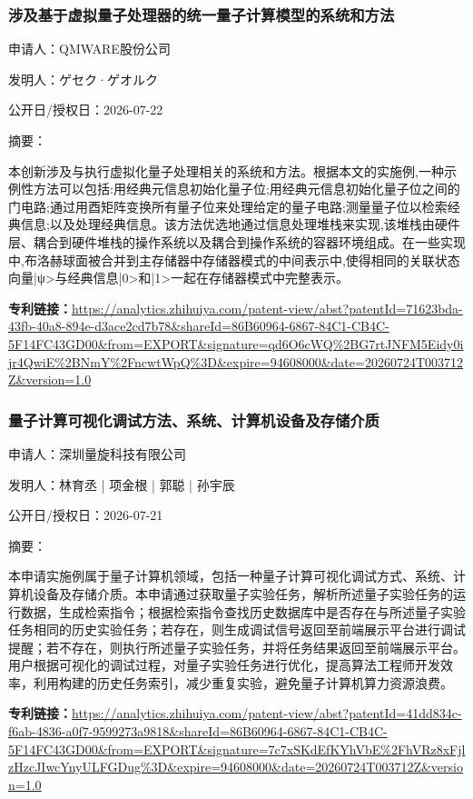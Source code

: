 \documentclass[12pt,a4paper]{ctexart}
\begin{document}
\subsubsection{ 涉及基于虚拟量子处理器的统一量子计算模型的系统和方法 }

申请人：QMWARE股份公司

发明人：ゲセク·ゲオルク

公开日/授权日：2026-07-22

摘要：

本创新涉及与执行虚拟化量子处理相关的系统和方法。根据本文的实施例,一种示例性方法可以包括:用经典元信息初始化量子位;用经典元信息初始化量子位之间的门电路;通过用酉矩阵变换所有量子位来处理给定的量子电路;测量量子位以检索经典信息;以及处理经典信息。该方法优选地通过信息处理堆栈来实现,该堆栈由硬件层、耦合到硬件堆栈的操作系统以及耦合到操作系统的容器环境组成。在一些实现中,布洛赫球面被合并到主存储器中存储器模式的中间表示中,使得相同的关联状态向量|ψ>与经典信息|0>和|1>一起在存储器模式中完整表示。

\noindent\textbf{专利链接：}\url{https://analytics.zhihuiya.com/patent-view/abst?patentId=71623bda-43fb-40a8-894e-d3ace2cd7b78&shareId=86B60964-6867-84C1-CB4C-5F14FC43GD00&from=EXPORT&signature=qd6O6cWQ%2BG7rtJNFM5Eidy0ijr4QwiE%2BNmY%2FncwtWpQ%3D&expire=94608000&date=20260724T003712Z&version=1.0}

\subsubsection{ 量子计算可视化调试方法、系统、计算机设备及存储介质 }

申请人：深圳量旋科技有限公司

发明人：林育丞 | 项金根 | 郭聪 | 孙宇辰

公开日/授权日：2026-07-21

摘要：

本申请实施例属于量子计算机领域，包括一种量子计算可视化调试方式、系统、计算机设备及存储介质。本申请通过获取量子实验任务，解析所述量子实验任务的运行数据，生成检索指令；根据检索指令查找历史数据库中是否存在与所述量子实验任务相同的历史实验任务；若存在，则生成调试信号返回至前端展示平台进行调试提醒；若不存在，则执行所述量子实验任务，并将任务结果返回至前端展示平台。用户根据可视化的调试过程，对量子实验任务进行优化，提高算法工程师开发效率，利用构建的历史任务索引，减少重复实验，避免量子计算机算力资源浪费。

\noindent\textbf{专利链接：}\url{https://analytics.zhihuiya.com/patent-view/abst?patentId=41dd834c-f6ab-4836-a0f7-9599273a9818&shareId=86B60964-6867-84C1-CB4C-5F14FC43GD00&from=EXPORT&signature=7c7xSKdEfKYhVbE%2FhVRz8xFjlzHzcJIwcYnyULFGDug%3D&expire=94608000&date=20260724T003712Z&version=1.0}
\end{document}
